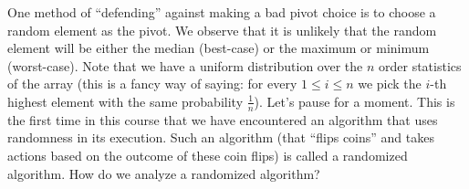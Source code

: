 \documentclass [12pt]{article}
\begin{document}
One method of ``defending'' against making a bad pivot choice is to choose a random element
as the pivot. We observe that it is unlikely that the random element will be either the
median (best-case) or the maximum or minimum (worst-case). Note that we have a uniform
distribution over the $n$ order statistics of the array (this is a fancy way of saying: for every
$1 \leq i \leq n$ we pick the $i$-th highest element with the same probability $\frac{1}{n}$). Let's pause for a moment. This is the first time in this course that we have encountered an algorithm that uses randomness in its execution. Such an algorithm (that ``flips coins'' and takes actions based on the outcome of these coin flips) is called a randomized algorithm. How do we analyze a randomized algorithm?
\end{document}
